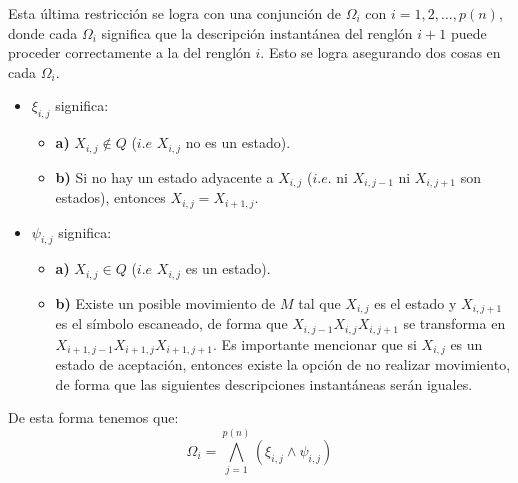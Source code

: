 \documentclass[a4paper]{article}
\begin{document}
Esta última restricción se logra con una conjunción de $\Omega_i$ con $i = 1,2,\dots,p(n)$, donde cada $\Omega_i$ significa que la descripción instantánea del renglón $i+1$ puede proceder correctamente a la del renglón $i$. Esto se logra asegurando dos cosas en cada $\Omega_i$.

\begin{itemize}
  \item $\xi_{i,j}$ significa:
    \begin{itemize}
      \item \textbf{a)} $X_{i,j} \not \in Q$ ($i.e$ $X_{i,j}$ no es un estado).
      \item \textbf{b)} Si no hay un estado adyacente a $X_{i,j}$ ($i.e.$ ni $X_{i,j-1}$ ni $X_{i,j+1}$ son estados), entonces $X_{i,j}=X_{i+1,j}$.
    \end{itemize}
  \item $\psi_{i,j}$ significa:
    \begin{itemize}
      \item \textbf{a)} $X_{i,j} \in Q$ ($i.e$ $X_{i,j}$ es un estado).
      \item \textbf{b)} Existe un posible movimiento de $M$ tal que $X_{i,j}$ es el estado y $X_{i,j+1}$ es el símbolo escaneado, de forma que $X_{i,j-1} X_{i,j} X_{i,j+1}$ se transforma en $X_{i+1,j-1} X_{i+1,j} X_{i+1,j+1}$. Es importante mencionar que si $X_{i,j}$ es un estado de aceptación, entonces existe la opción de no realizar movimiento, de forma que las siguientes descripciones instantáneas serán iguales.
    \end{itemize}
\end{itemize}
De esta forma tenemos que:
$$\Omega_i = \bigwedge_{j=1}^{p(n)}\left(\xi_{i,j}\land\psi_{i,j}\right)$$





\nocite{*}


%
\end{document}
